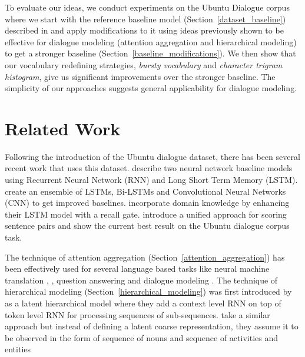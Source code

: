 \documentclass[11pt]{report}
\begin{document}
To evaluate our ideas, we conduct experiments on the Ubuntu Dialogue corpus where we start with the reference baseline model (Section~\ref{dataset_baseline}) described in \cite{lowe2015ubuntu} and apply modifications to it using ideas previously shown to be effective for dialogue modeling (attention aggregation and hierarchical modeling) to get a stronger baseline (Section~\ref{baseline_modifications}). We then show that our vocabulary redefining strategies, \textit{bursty vocabulary} and \textit{character trigram histogram}, give us significant improvements over the stronger baseline.  The simplicity of our approaches suggests general applicability for dialogue modeling. %

\section{Related Work} \label{related_work}

Following the introduction of the Ubuntu dialogue dataset, there has been several recent work that uses this dataset. 
\cite{lowe2015ubuntu} describe two neural network baseline models using Recurrent Neural Network (RNN) and Long Short Term Memory (LSTM). %
\cite{kadlec2015improved} create an ensemble of LSTMs, Bi-LSTMs and Convolutional Neural Networks (CNN) to get improved baselines. 
\cite{xu2016incorporating} incorporate domain knowledge by enhancing their LSTM model with a recall gate.
\cite{baudivs2016sentence} introduce a unified approach for scoring sentence pairs %
and show the current best result on the Ubuntu dialogue corpus task. 

The technique of attention aggregation (Section~\ref{attention_aggregation}) has been effectively used for several language based tasks like neural machine translation \cite{bahdanau2014neural}, \cite{luong2015effective}, question answering \cite{hermann2015teaching} and dialogue modeling \cite{yao2016attentional}. 
The technique of hierarchical modeling (Section~\ref{hierarchical_modeling}) was first introduced by \cite{serban2016hierarchical} as a latent hierarchical model where they add a context level RNN on top of token level RNN for processing sequences of sub-sequences.
\cite{serban2016multiresolution} take a similar approach but instead of defining a latent coarse representation, they assume it to be observed in the form of sequence of nouns and sequence of activities and entities
\end{document}
